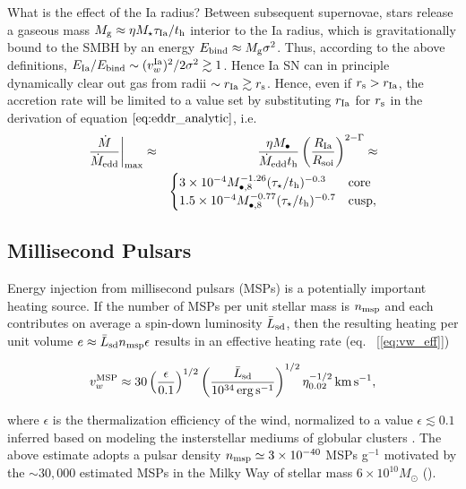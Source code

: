 \documentclass[usenatbib,fleqn]{mn2e}
\newcommand{\Mbheight}{M_{\bullet,8}}
\begin{document}
What is the effect of the Ia radius?  Between subsequent supernovae, stars release a gaseous mass $M_{\rm g} \approx \eta M_{\star}\tau_{\rm Ia}/t_{\rm h}$ interior to the Ia radius, which is gravitationally bound to the SMBH by an energy $E_{\rm bind} \approx M_{\rm g}\sigma^{2}$.  Thus, according to the above definitions, $E_{\rm Ia}/E_{\rm bind} \sim (v_{w}^{\rm Ia})^{2}/2\sigma^{2} \gtrsim 1$.  Hence Ia SN can in principle dynamically clear out gas from radii $\sim r_{\rm Ia} \gtrsim r_{\rm s}$.  Hence, even if $r_{\rm s} > r_{\rm Ia}$, the accretion rate will be limited to a value set by substituting $r_{\rm Ia}$ for $r_{\rm s}$ in the derivation of equation $\ref{eq:eddr_analytic}$, i.e.  
\begin{eqnarray}
\left.\frac{\dot{M}}{\dot{M}_{\rm edd}}\right|_{\rm max} &\approx& \frac{\eta M_{\bullet}}{\dot{M}_{\rm edd} t_{\rm h}}\left(\frac{R_{\rm Ia}}{R_{\rm soi}}\right)^{2-\Gamma} \approx \nonumber \\
 && \begin{cases}
    3 \times 10^{-4} M_{\bullet,8}^{-1.26}(\tau_{\star}/t_{\rm h})^{-0.3}
   & \text{core} \\
    1.5 \times 10^{-4} \Mbheight^{-0.77}(\tau_{\star}/t_{\rm h})^{-0.7}   & \text{cusp}, 
  \end{cases}
  \label{eq:eddr_Ia}
\end{eqnarray}


\subsection{Millisecond Pulsars}
 Energy injection from millisecond pulsars (MSPs) is a potentially
important heating source.  If the number of MSPs per unit stellar mass
is $n_{\rm msp}$ and each contributes on average a spin-down
luminosity $\bar{L}_{\rm sd}$, then the resulting heating per unit
volume $e \approx \bar{L}_{\rm sd}n_{\rm msp}\epsilon$ results in an
effective heating rate (eq.~ [\ref{eq:vw_eff}])

\begin{eqnarray} v_{w}^{\rm MSP} \approx
30\left(\frac{\epsilon}{0.1}\right)^{1/2}\left(\frac{\bar{L}_{\rm
sd}}{10^{34}\,{\rm erg\,s^{-1}}}\right)^{1/2} \eta_{0.02}^{-1/2}\,{\rm
km\,s^{-1}},
 \label{eq:vmsp}
  \end{eqnarray} 

where $\epsilon$ is the thermalization efficiency of
the wind, normalized to a value $\epsilon \lesssim 0.1$ inferred based
on modeling the insterstellar mediums of globular clusters
\citep{NaimanSoares-Furtado+:2013a}.  The above estimate adopts a
pulsar density $n_{\rm msp}\simeq3 \times 10^{-40} $ MSPs g$^{-1}$
motivated by the $\sim 30,000$ estimated MSPs in the Milky Way of
stellar mass $6\times 10^{10}M_{\odot}$ (\citealt{Lorimer13}).
\end{document}
